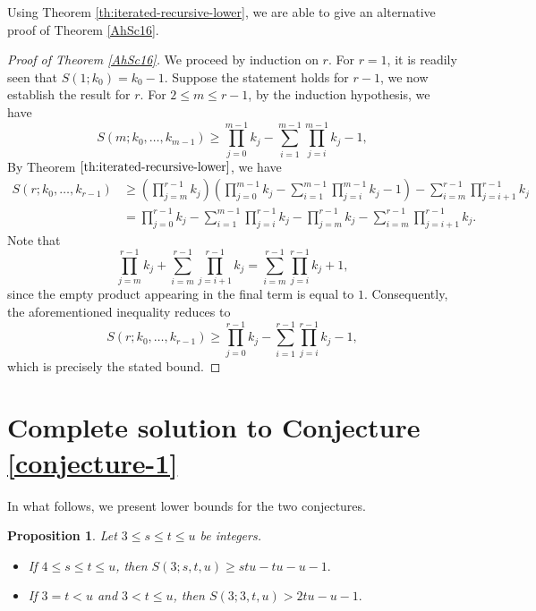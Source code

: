 \documentclass[twoside, 12pt]{article}
\newtheorem{proposition}{Proposition}[section]
\begin{document}
Using Theorem \ref{th:iterated-recursive-lower}, we are able to give an alternative proof of Theorem \ref{AhSc16}.

\begin{proof}[Proof of Theorem \ref{AhSc16}]
We proceed by induction on $r$. For $r=1$, it is readily seen that $S(1;k_0)=k_0-1$. Suppose the statement holds for $r-1$, we now establish the result for $r$. For $2 \leq m \leq r-1$,
by the induction hypothesis, we have
\[
S(m; k_0, \dots, k_{m-1}) \geq \prod_{j=0}^{m-1} k_j - \sum_{i=1}^{m-1} \prod_{j=i}^{m-1} k_j - 1,
\]
By Theorem $\ref{th:iterated-recursive-lower}$, we have
\[
\begin{aligned}
S(r; k_0, \dots, k_{r-1}) &\geq \left( \prod_{j=m}^{r-1} k_j \right) \left( \prod_{j=0}^{m-1} k_j - \sum_{i=1}^{m-1} \prod_{j=i}^{m-1} k_j - 1 \right) - \sum_{i=m}^{r-1} \prod_{j=i+1}^{r-1} k_j \\
&= \prod_{j=0}^{r-1} k_j - \sum_{i=1}^{m-1} \prod_{j=i}^{r-1} k_j - \prod_{j=m}^{r-1} k_j - \sum_{i=m}^{r-1} \prod_{j=i+1}^{r-1} k_j.
\end{aligned}
\]
Note that
\[
\prod_{j=m}^{r-1} k_j + \sum_{i=m}^{r-1} \prod_{j=i+1}^{r-1} k_j = \sum_{i=m}^{r-1} \prod_{j=i}^{r-1} k_j + 1,
\]
since the empty product appearing in the final term is equal to $1$.
Consequently, the aforementioned inequality reduces to
\[
S(r; k_0, \dots, k_{r-1}) \geq \prod_{j=0}^{r-1} k_j - \sum_{i=1}^{r-1} \prod_{j=i}^{r-1} k_j - 1,
\]
which is precisely the stated bound.
\end{proof}

\section{Complete solution to Conjecture \ref{conjecture-1}}



In what follows, we present lower bounds for the two conjectures.



\begin{proposition}\label{pro-1}
Let $3 \leq s \leq t \leq u$ be integers.
\begin{itemize}
\item If $4 \leq s \leq t \leq u$, then
$
S(3;s,t,u) \geq stu-tu-u-1.
$
\item If $3=t<u$ and $3<t \leq u$, then
$
S(3;3,t,u) >2tu-u-1.
$
\end{itemize}
\end{proposition}
\end{document}
